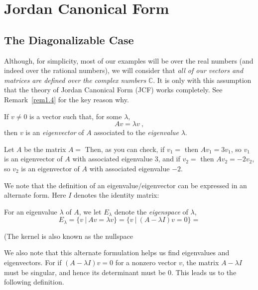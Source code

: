 
\chapter{Jordan Canonical Form}
%

\section{The Diagonalizable Case}

Although, for simplicity, most of our examples
will be over the real numbers
(and indeed over the rational numbers), we will consider that
\textit{all of our vectors and matrices
are defined over the complex numbers} $\mathbb{C}$.
It is only with this assumption that the
theory of Jordan Canonical Form (JCF) works
%
completely.
See Remark~\ref{rem1.4} for the key reason why.\\

\begin{definition}
\label{def1.1}
If \(v \neq 0\) is a vector such that, for some
$\lambda$,
\[
A v = \lambda v~,
\]
then $v$ is an \textit{eigenvector} of $A$ associated
%
to the \textit{eigenvalue} $\lambda$.
%
\end{definition}

\begin{example}
\label{exa1.2}
Let $A$ be the matrix $A =$
Then, as you can check, if $v_1 =$ 
then $A v_1 = 3 v_1$, so $v_1$ is an eigenvector of $A$ with associated
eigenvalue $3$, and if $v_2 =$ 
then $A v_2 = -2 v_2$, so $v_2$ is
an eigenvector of $A$ with associated eigenvalue $-2$.
\end{example}


We note that the definition of an eigenvalue/eigenvector can be expressed
in an alternate form.
Here $I$ denotes the identity matrix:

For an eigenvalue $\lambda$ of $A$, we let $E_{\lambda}$ denote
the \textit{eigenspace} of $\lambda$,
%
\[
E_{\lambda}=\{v \ |\ Av=\lambda v\}=\{v \ |\ (A-\lambda I)v=0\} =
\]

(The kernel  is also known as the nullspace

We also note that this alternate formulation helps us find eigenvalues and
eigenvectors.
For if $(A - \lambda I) v = 0$ for a nonzero vector $v$,
the matrix $A - \lambda I$ must be singular,
and hence its determinant must be
$0$.
This leads us to the following definition.

